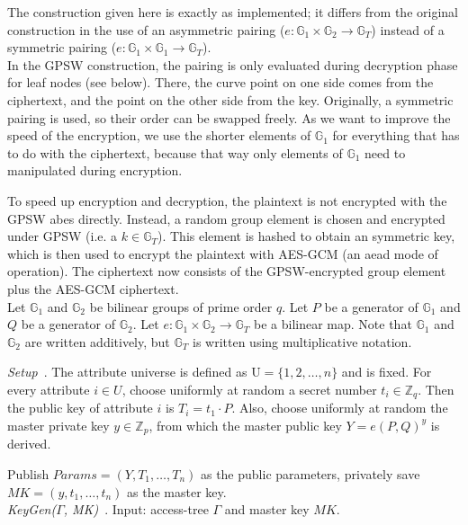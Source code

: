 The construction given here is exactly as implemented; it differs from the original construction in the use of an asymmetric pairing ($e: \mathbb{G}_1 \times \mathbb{G}_2 \rightarrow \mathbb{G}_T$) instead of a symmetric pairing ($e: \mathbb{G}_1 \times \mathbb{G}_1 \rightarrow \mathbb{G}_T$).\\
In the GPSW construction, the pairing is only evaluated during decryption phase for leaf nodes (see below).
There, the curve point on one side comes from the ciphertext, and the point on the other side from the key.
Originally, a symmetric pairing is used, so their order can be swapped freely.
As we want to improve the speed of the encryption, we use the shorter elements of $\mathbb{G}_1$ for everything that has to do with the ciphertext, because that way only elements of $\mathbb{G}_1$ need to manipulated during encryption.

To speed up encryption and decryption, the plaintext is not encrypted with the GPSW \acrshort{abes} directly.
Instead, a random group element is chosen and encrypted under GPSW (i.e. a $k \in \mathbb{G}_T$).
This element is hashed to obtain an symmetric key, which is then used to encrypt the plaintext with AES-GCM (an \acrshort{aead} mode of operation).
The ciphertext now consists of the GPSW-encrypted group element plus the AES-GCM ciphertext.
\\
Let $\mathbb{G}_1$ and $\mathbb{G}_2$ be bilinear groups of prime order $q$. Let $P$ be a generator of $\mathbb{G}_1$ and $Q$ be a generator of $\mathbb{G}_2$. Let $e: \mathbb{G}_1 \times \mathbb{G}_2 \rightarrow \mathbb{G}_T$ be a bilinear map.
Note that $\mathbb{G}_1$ and $\mathbb{G}_2$ are written additively, but $\mathbb{G}_T$ is written using multiplicative notation.

\emph{Setup}~\cite{goyal_attribute-based_2006}.
The attribute universe is defined as $\text{U} = \{1, 2, \dots, n\}$ and is fixed.
For every attribute $i \in U$, choose uniformly at random a secret number $t_i \in \mathbb{Z}_q$.
Then the public key of attribute $i$ is $T_i = t_1 \cdot P$.
Also, choose uniformly at random the master private key $y \in \mathbb{Z}_p$, from which the master public key $Y = e(P, Q)^y$ is derived.

Publish $Params=(Y, T_1, \dots, T_n)$ as the public parameters, privately save $MK = (y, t_1, \dots, t_n)$ as the master key.
\\

\emph{KeyGen($\Gamma$, MK)}~\cite{goyal_attribute-based_2006}.
Input: \gls{access-tree} $\Gamma$ and master key $MK$.

